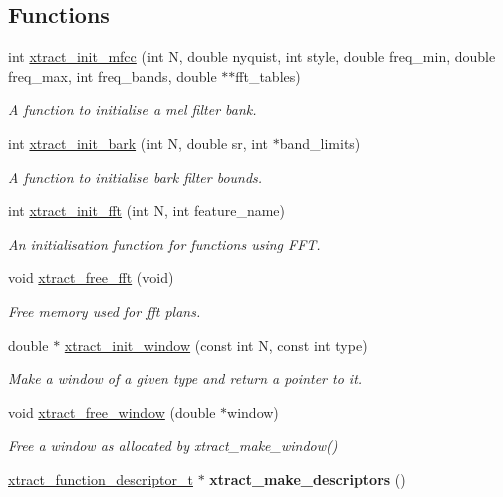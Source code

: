 \subsection*{Functions}
\begin{DoxyCompactItemize}
\item 
int \hyperlink{group__libxtract_gab6d8abe721243e853ea6eec0339c6941}{xtract\-\_\-init\-\_\-mfcc} (int N, double nyquist, int style, double freq\-\_\-min, double freq\-\_\-max, int freq\-\_\-bands, double $\ast$$\ast$fft\-\_\-tables)
\begin{DoxyCompactList}\small\item\em A function to initialise a mel filter bank. \end{DoxyCompactList}\item 
int \hyperlink{group__libxtract_ga82300f93d29763bee76093c4ff3e6776}{xtract\-\_\-init\-\_\-bark} (int N, double sr, int $\ast$band\-\_\-limits)
\begin{DoxyCompactList}\small\item\em A function to initialise bark filter bounds. \end{DoxyCompactList}\item 
int \hyperlink{group__libxtract_ga10fc063fe6a4adf5f44e940c86be8b77}{xtract\-\_\-init\-\_\-fft} (int N, int feature\-\_\-name)
\begin{DoxyCompactList}\small\item\em An initialisation function for functions using F\-F\-T. \end{DoxyCompactList}\item 
void \hyperlink{group__libxtract_gabb14256ec2423f2e690326992d0e5945}{xtract\-\_\-free\-\_\-fft} (void)
\begin{DoxyCompactList}\small\item\em Free memory used for fft plans. \end{DoxyCompactList}\item 
double $\ast$ \hyperlink{group__libxtract_ga02f6dc4128633345c95ca1c0589db5db}{xtract\-\_\-init\-\_\-window} (const int N, const int type)
\begin{DoxyCompactList}\small\item\em Make a window of a given type and return a pointer to it. \end{DoxyCompactList}\item 
void \hyperlink{group__libxtract_ga814a5f06fed62038311c99cd0e3c8e38}{xtract\-\_\-free\-\_\-window} (double $\ast$window)
\begin{DoxyCompactList}\small\item\em Free a window as allocated by xtract\-\_\-make\-\_\-window() \end{DoxyCompactList}\item 
\hypertarget{group__libxtract_gac8c555567783a7b8935713bddec0e98f}{\hyperlink{group__libxtract_ga72fe2031f7b7a4cd73879a3fdf358986}{xtract\-\_\-function\-\_\-descriptor\-\_\-t} $\ast$ {\bfseries xtract\-\_\-make\-\_\-descriptors} ()}\label{group__libxtract_gac8c555567783a7b8935713bddec0e98f}


\end{DoxyCompactItemize}
